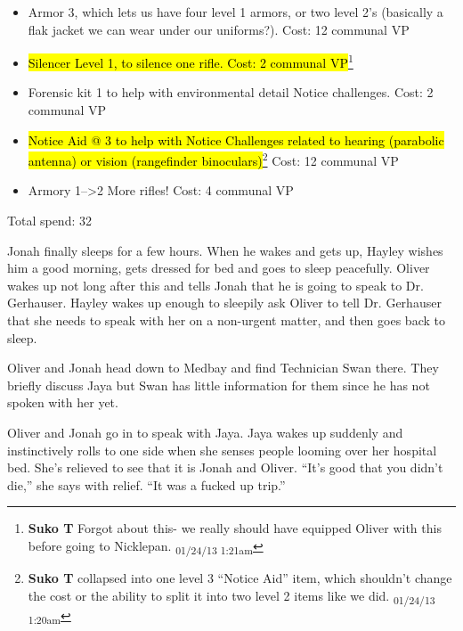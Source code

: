 \begin{itemize}
\item Armor 3, which lets us have four level 1 armors, or two level 2's (basically a flak jacket we can wear under our uniforms?).  Cost: 12 communal VP
\item \hl{Silencer Level 1, to silence one rifle. Cost: 2 communal VP}\footnote{\textbf{Suko T }Forgot about this- we really should have equipped Oliver with this before going to Nicklepan. \textsubscript{01/24/13 1:21am}}
\item Forensic kit 1 to help with environmental detail Notice challenges.  Cost: 2 communal VP
\item \hl{Notice Aid @ 3 to help with Notice Challenges related to hearing (parabolic antenna) or vision (rangefinder binoculars)}\footnote{\textbf{Suko T }collapsed into one level 3 ``Notice Aid'' item, which shouldn't change the cost or the ability to split it into two level 2 items like we did. \textsubscript{01/24/13 1:20am}}  Cost: 12 communal VP
\item Armory 1--\textgreater 2  More rifles!  Cost: 4 communal VP
\end{itemize}



Total spend: 32






Jonah finally sleeps for a few hours.  When he wakes and gets up, Hayley wishes him a good morning, gets dressed for bed and goes to sleep peacefully.  Oliver wakes up not long after this and tells Jonah that he is going to speak to Dr. Gerhauser.  Hayley wakes up enough to sleepily ask Oliver to tell Dr. Gerhauser that she needs to speak with her on a non-urgent matter, and then goes back to sleep.



Oliver and Jonah head down to Medbay and find Technician Swan there.  They briefly discuss Jaya but Swan has little information for them since he has not spoken with her yet. 



Oliver and Jonah go in to speak with Jaya.  Jaya wakes up suddenly and instinctively rolls to one side when she senses people looming over her hospital bed.  She's relieved to see that it is Jonah and Oliver. ``It's good that you didn't die,'' she says with relief.  ``It was a fucked up trip.''

